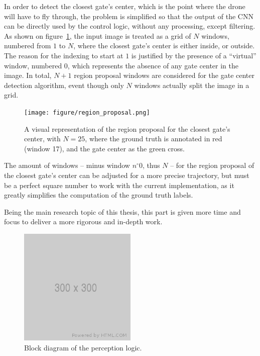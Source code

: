 In order to detect the closest gate's center, which is the point where the
drone will have to fly through, the problem is simplified so that the output of
the CNN can be directly used by the control logic, without any processing,
except filtering. As shown on figure~\ref{fig:regionproposal}, the input image
is treated as a grid of $N$ windows, numbered from $1$ to $N$, where the
closest gate's center is either inside, or outside. The reason for the indexing
to start at $1$ is justified by the presence of a ``virtual'' window, numbered
$0$, which represents the absence of any gate center in the image. In total,
$N+1$ region proposal windows are considered for the gate center detection
algorithm, event though only $N$ windows actually split the image in a grid.

\begin{figure}[h!]
	\center
	\texttt{[image: figure/region\_proposal.png]}
	\caption[Visual representation of the region proposal grid]{A visual
		representation of the region proposal for the closest gate's center, with
		$N=25$, where the ground truth is annotated in red (window 17), and the gate
		center as the green cross.}
	\label{fig:regionproposal}
\end{figure}

The amount of windows -- minus window $n^{\circ}0$, thus $N$ -- for the region
proposal of the closest gate's center can be adjusted for a more precise
trajectory, but must be a perfect square number to work with the current
implementation, as it greatly simplifies the computation of the ground truth
labels.

Being the main research topic of this thesis, this part is given more time and
focus to deliver a more rigorous and in-depth work.\\

\begin{figure}[h]
	\centering
	\includegraphics[width=0.5\textwidth]{figure/300x300.png}
	\caption{Block diagram of the perception logic.}
	\label{fig:perception-block}
\end{figure}

